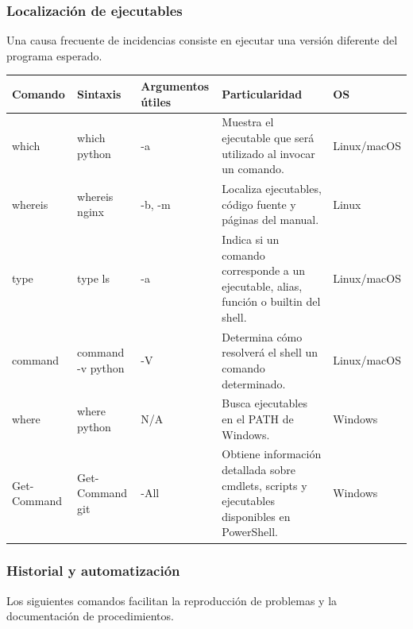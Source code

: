 \documentclass[a4paper,10pt]{article}
\begin{document}

\subsubsection{Localización de ejecutables}

Una causa frecuente de incidencias consiste en ejecutar una versión diferente
del programa esperado.

\begin{longtable}{|p{2.8cm}|p{3.3cm}|p{4cm}|p{5.3cm}|p{1.5cm}|}

\hline
Comando &
Sintaxis &
Argumentos útiles &
Particularidad &
OS
\\
\hline
\endhead

which &
which python &
-a &
Muestra el ejecutable que será utilizado al invocar un comando. &
Linux/macOS
\\
\hline

whereis &
whereis nginx &
-b, -m &
Localiza ejecutables, código fuente y páginas del manual. &
Linux
\\
\hline

type &
type ls &
-a &
Indica si un comando corresponde a un ejecutable, alias, función o builtin del shell. &
Linux/macOS
\\
\hline

command &
command -v python &
-V &
Determina cómo resolverá el shell un comando determinado. &
Linux/macOS
\\
\hline

where &
where python &
N/A &
Busca ejecutables en el PATH de Windows. &
Windows
\\
\hline

Get-Command &
Get-Command git &
-All &
Obtiene información detallada sobre cmdlets, scripts y ejecutables disponibles en PowerShell. &
Windows
\\
\hline

\end{longtable}


\subsubsection{Historial y automatización}

Los siguientes comandos facilitan la reproducción de problemas y la
documentación de procedimientos.
\end{document}
